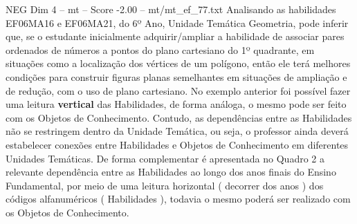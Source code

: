 \begin{textsample}{NEG Dim 4 – mt – Score -2.00 – mt/mt\_ef\_77.txt}
Analisando as habilidades EF06MA16 e EF06MA21, do 6º Ano, Unidade Temática Geometria, pode inferir que, se o estudante inicialmente adquirir/ampliar a habilidade de associar pares ordenados de números a pontos do plano cartesiano do 1º quadrante, em situações como a localização dos vértices de um polígono, então ele terá melhores condições para construir figuras planas semelhantes em situações de ampliação e de redução, com o uso de plano cartesiano.
No exemplo anterior foi possível fazer uma leitura \textbf{vertical} das Habilidades, de forma análoga, o mesmo pode ser feito com os Objetos de Conhecimento.
Contudo, as dependências entre as Habilidades não se restringem dentro da Unidade Temática, ou seja, o professor ainda deverá estabelecer conexões entre Habilidades e Objetos de Conhecimento em diferentes Unidades Temáticas.
De forma complementar é apresentada no Quadro 2 a relevante dependência entre as Habilidades ao longo dos anos finais do Ensino Fundamental, por meio de uma leitura horizontal ( decorrer dos anos ) dos códigos alfanuméricos ( Habilidades ), todavia o mesmo poderá ser realizado com os Objetos de Conhecimento.

\end{textsample}
